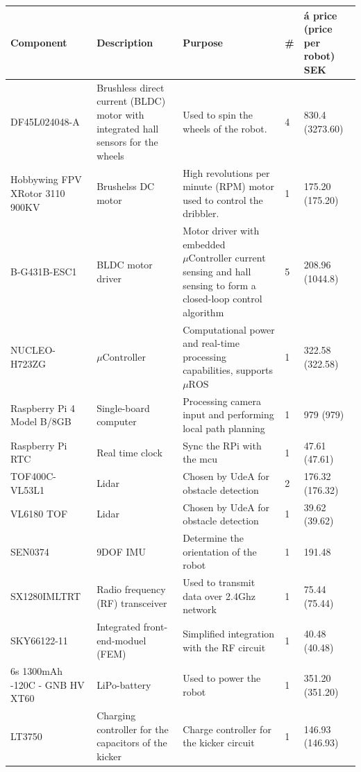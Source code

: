\begin{center}
\begin{longtable}{|p{3cm}|p{3cm}|p{3cm}|p{1cm}|p{3cm}| }
        \hline
        \rowcolor{gray!50} \textbf{Component} & \textbf{Description} & \textbf{Purpose} & \textbf{\#} & \textbf{á price (price per robot) SEK}\\ \endhead 
        \hline
        DF45L024048-A & Brushless direct current (BLDC) motor with integrated hall sensors for the wheels & Used to spin the wheels of the robot. & 4 & 830.4 (3273.60)\\ \hline 
        Hobbywing FPV XRotor 3110 900KV & Brushelss DC motor & High revolutions per minute (RPM) motor used to control the dribbler. & 1 & 175.20 (175.20) \\ \hline 
        B-G431B-ESC1 & BLDC motor driver & Motor driver with embedded $\mu\text{Controller}$ current sensing and hall sensing to form a closed-loop control algorithm & 5 & 208.96 (1044.8) \\ \hline 
        NUCLEO-H723ZG & $\mu\text{Controller}$ & Computational power and real-time processing capabilities, supports $\mu\text{ROS}$ & 1 & 322.58 (322.58) \\ \hline 
        Raspberry Pi 4 Model B/8GB & Single-board computer & Processing camera input and performing local path planning & 1 & 979 (979) \\ \hline
        Raspberry Pi RTC & Real time clock & Sync the RPi with the \ac{mcu} & 1 & 47.61 (47.61)\\ \hline
        TOF400C-VL53L1 & Lidar & Chosen by UdeA for obstacle detection & 2 & 176.32 (176.32) \\ \hline
        VL6180 TOF & Lidar & Chosen by UdeA for obstacle detection & 1 & 39.62 (39.62) \\ \hline
        SEN0374 & 9DOF IMU & Determine the orientation of the robot & 1 & 191.48\\ \hline
        SX1280IMLTRT & Radio frequency (RF) transceiver & Used to transmit data over 2.4Ghz network & 1 & 75.44 (75.44) \\ \hline 
        SKY66122-11 & Integrated front-end-moduel (FEM) & Simplified integration with the RF circuit & 1 & 40.48 (40.48) \\ \hline 
        6s 1300mAh -120C - GNB HV XT60 & LiPo-battery & Used to power the robot & 1 & 351.20 (351.20) \\ \hline 
        LT3750 & Charging controller for the capacitors of the kicker & Charge controller for the kicker circuit & 1 & 146.93 (146.93)\\ \hline 

\end{longtable}
\end{center}
